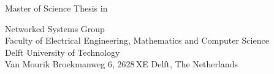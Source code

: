 
%
%
%
%

\begin{titlepage}

\begin{center}
\null\vfill
\begin{center}
\LARGE{\reportTitle}
\end{center}

\vspace{3cm}

\begin{large}
Master of Science Thesis in \reportMSC
\end{large}

\vspace{1.5cm}

\begin{normalsize}
Networked Systems Group\\
Faculty of Electrical Engineering, Mathematics and Computer Science\\
Delft University of Technology\\
Van Mourik Broekmanweg 6, 2628\,XE Delft, The Netherlands
\end{normalsize}

\vspace{2.0cm}

\begin{normalsize}
\reportAuthor \\
\reportUrlEmailTUD \\
\reportUrlEmailNonTUD
\end{normalsize}

\vspace{1.0cm}

\reportDate

\vfill
\end{center}

\end{titlepage}
